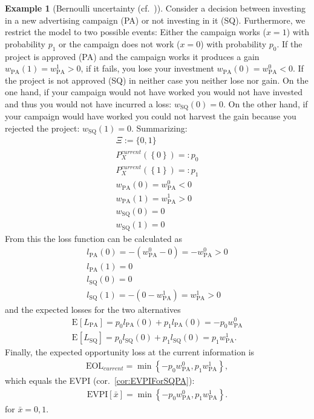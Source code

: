 \documentclass[a4paper,10pt,twoside,pagesize,abstracton]{scrartcl}
\newcommand{\E}[2][]{\mathrm{E}_{#1}\left[#2\right]} %
\newcommand{\EOL}[1][]{\mathrm{EOL}_{#1}} %
\newcommand{\EVPI}{\mathrm{EVPI}} %
\newcommand{\PA}{\mathrm{PA}} %
\newcommand{\SQ}{\mathrm{SQ}} %
\theoremstyle{plain}%
\theoremstyle{definition}
\newtheorem{exmp}[thm]{Example}
\theoremstyle{remark}
\begin{document}
\begin{exmp}[Bernoulli uncertainty (cf.~{\citet[pp.147, in particular exhibit 7.1]{Hubbard2014}})] 
Consider a decision between investing in a new advertising campaign (PA) or not investing in it (SQ). Furthermore, we restrict the model to two possible events: Either the campaign works ($x=1$) with probability $p_1$ or the campaign does not work ($x=0$) with probability $p_0$. If the project is approved (PA) and the campaign works it produces a gain $ w_\PA (1) = w_\PA^1 > 0$, if it fails, you lose your investment $w_\PA (0) = w_\PA^0 < 0$. If the project is not approved (SQ) in neither case you neither lose nor gain. On the one hand, if your campaign would not have worked you would not have invested and thus you would not have incurred a loss: $ w_\SQ (0) = 0$. On the other hand, if your campaign would have worked you could not harvest the gain because you rejected the project: $w_\SQ (1) = 0$. Summarizing:
  \begin{subequations}
  \begin{align}
    \Xi := \{0,1\}\\
    P_X^{current}\left(\left\{ 0\right\}\right) =: p_0\\
    P_X^{current}\left(\left\{ 1\right\}\right) =: p_1\\
    w_\PA (0) = w_\PA^0 < 0\\
    w_\PA (1) = w_\PA^1 > 0\\
    w_\SQ (0) = 0\\
    w_\SQ (1) = 0 
  \end{align}
  \end{subequations}
  From this the loss function can be calculated as
  \begin{subequations}
  \begin{align}
    l_\PA(0) = - (w_\PA^0 - 0) = -w_\PA^0 > 0\\
    l_\PA(1) = 0\\
    l_\SQ(0) = 0\\
    l_\SQ(1) = - ( 0 - w_\PA^1) = w_\PA^1 > 0
  \end{align}
  \end{subequations}
  and the expected losses for the two alternatives
  \begin{subequations}
  \begin{align}
   \E{L_\PA} = p_0 l_\PA(0) + p_1 l_\PA(0) = - p_0 w_\PA^0\\
   \E{L_\SQ} = p_0 l_\SQ(0) + p_1 l_\SQ(0) = p_1 w_\PA^1.
  \end{align}
    \end{subequations}
  Finally, the expected opportunity loss at the current information is
  \begin{align}
   \EOL[current] = \min \left\{ - p_0 w_\PA^0, p_1 w_\PA^1 \right \},
  \end{align}
  which equals the EVPI (cor.~\ref{cor:EVPIForSQPA}):
  \begin{align}
    \EVPI[\bar{x}] = \min \left\{ - p_0 w_\PA^0, p_1 w_\PA^1 \right \}.
  \end{align}
  for $\bar{x} = 0,1$.
\end{exmp}
\end{document}
